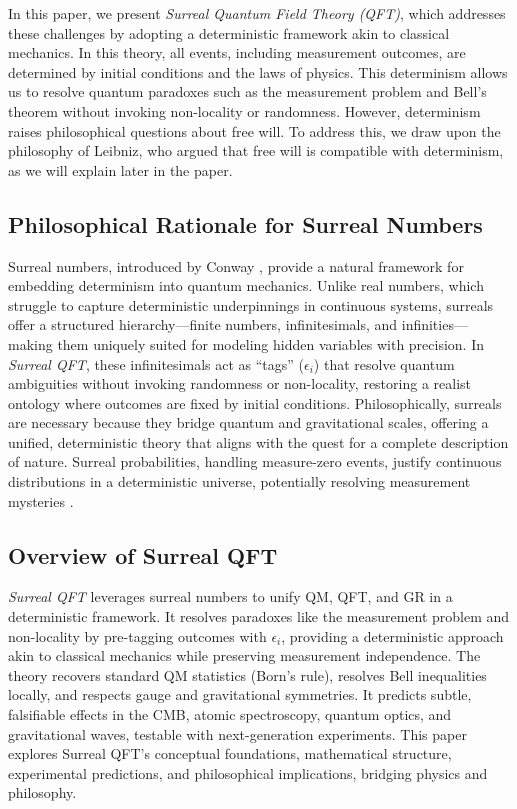\documentclass{article}
\begin{document}
In this paper, we present \textit{Surreal Quantum Field Theory (QFT)}, which addresses these challenges by adopting a deterministic framework akin to classical mechanics. In this theory, all events, including measurement outcomes, are determined by initial conditions and the laws of physics. This determinism allows us to resolve quantum paradoxes such as the measurement problem and Bell's theorem without invoking non-locality or randomness. However, determinism raises philosophical questions about free will. To address this, we draw upon the philosophy of Leibniz, who argued that free will is compatible with determinism, as we will explain later in the paper.

\subsection{Philosophical Rationale for Surreal Numbers}
Surreal numbers, introduced by Conway \cite{Conway1976}, provide a natural framework for embedding determinism into quantum mechanics. Unlike real numbers, which struggle to capture deterministic underpinnings in continuous systems, surreals offer a structured hierarchy---finite numbers, infinitesimals, and infinities---making them uniquely suited for modeling hidden variables with precision. In \textit{Surreal QFT}, these infinitesimals act as ``tags'' (\(\epsilon_i\)) that resolve quantum ambiguities without invoking randomness or non-locality, restoring a realist ontology where outcomes are fixed by initial conditions. Philosophically, surreals are necessary because they bridge quantum and gravitational scales, offering a unified, deterministic theory that aligns with the quest for a complete description of nature. Surreal probabilities, handling measure-zero events, justify continuous distributions in a deterministic universe, potentially resolving measurement mysteries \cite{Pruss2010}.

\subsection{Overview of Surreal QFT}
\textit{Surreal QFT} leverages surreal numbers to unify QM, QFT, and GR in a deterministic framework. It resolves paradoxes like the measurement problem and non-locality by pre-tagging outcomes with \(\epsilon_i\), providing a deterministic approach akin to classical mechanics while preserving measurement independence. The theory recovers standard QM statistics (Born's rule), resolves Bell inequalities locally, and respects gauge and gravitational symmetries. It predicts subtle, falsifiable effects in the CMB, atomic spectroscopy, quantum optics, and gravitational waves, testable with next-generation experiments. This paper explores Surreal QFT's conceptual foundations, mathematical structure, experimental predictions, and philosophical implications, bridging physics and philosophy.
\end{document}
